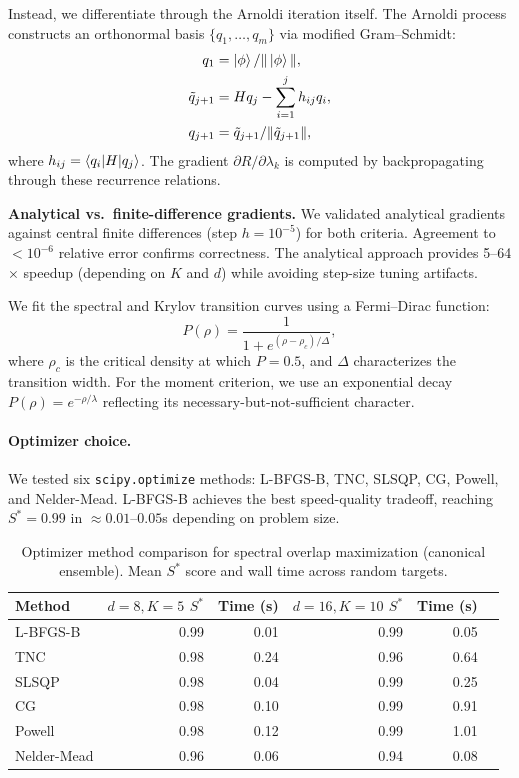 \documentclass[aps,prx,reprint,superscriptaddress,footnote, twocolumn,notitlepage]{revtex4-2}
\begin{document}
Instead, we differentiate through the Arnoldi iteration itself. The Arnoldi process
constructs an orthonormal basis $\{q_1, \ldots, q_m\}$ via modified Gram--Schmidt:
\begin{align}
q_1 &= \ket{\phi}/\|\ket{\phi}\|, \\
\tilde{q}_{j+1} &= H q_j - \sum_{i=1}^{j} h_{ij} q_i, \\
q_{j+1} &= \tilde{q}_{j+1} / \|\tilde{q}_{j+1}\|,
\end{align}
where $h_{ij} = \braket{q_i | H | q_j}$. The gradient $\partial R / \partial \lambda_k$
is computed by backpropagating through these recurrence relations.

\textbf{Analytical vs.\ finite-difference gradients.} We validated analytical gradients
against central finite differences (step $h = 10^{-5}$) for both criteria. Agreement
to $< 10^{-6}$ relative error confirms correctness. The analytical approach provides
5--64$\times$ speedup (depending on $K$ and $d$) while avoiding step-size tuning artifacts.

We fit the spectral and Krylov transition curves using a Fermi--Dirac function:
\begin{equation}
P(\rho) = \frac{1}{1 + e^{(\rho - \rho_c)/\Delta}},
\label{eq:fermi_fit}
\end{equation}
where $\rho_c$ is the critical density at which $P = 0.5$, and $\Delta$ characterizes
the transition width. For the moment criterion, we use an exponential decay
$P(\rho) = e^{-\rho/\lambda}$ reflecting its necessary-but-not-sufficient character.

\paragraph{Optimizer choice.}
We tested six \texttt{scipy.optimize} methods: L-BFGS-B, TNC, SLSQP, CG, Powell, and Nelder-Mead. L-BFGS-B achieves the best speed-quality tradeoff, reaching $S^* = 0.99$ in $\approx 0.01$--$0.05$s depending on problem size.

\begin{table}[htbp]
\centering
\caption{Optimizer method comparison for spectral overlap maximization (canonical ensemble). Mean $S^*$ score and wall time across random targets.}
\label{tab:optimizer_comparison}
\begin{tabular}{lrrrrr}
\toprule
Method & $d=8,K=5$ $S^*$ & Time (s) & $d=16,K=10$ $S^*$ & Time (s) \\
\midrule
  L-BFGS-B & 0.99 & 0.01 & 0.99 & 0.05 \\
  TNC & 0.98 & 0.24 & 0.96 & 0.64 \\
  SLSQP & 0.98 & 0.04 & 0.99 & 0.25 \\
  CG & 0.98 & 0.10 & 0.99 & 0.91 \\
  Powell & 0.98 & 0.12 & 0.99 & 1.01 \\
  Nelder-Mead & 0.96 & 0.06 & 0.94 & 0.08 \\
\bottomrule
\end{tabular}
\end{table}
\end{document}
